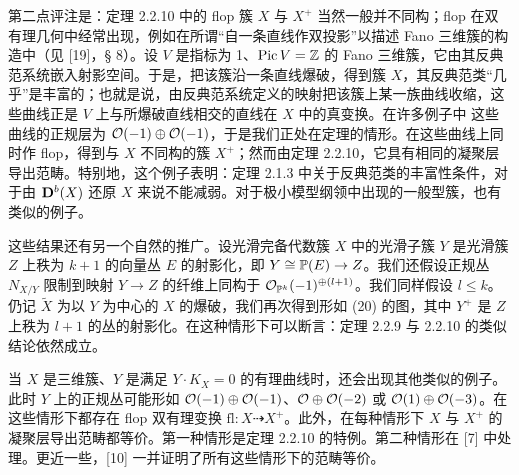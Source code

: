 第二点评注是：定理 2.2.10 中的 flop 簇 $X$ 与 $X^+$ 当然一般并不同构；flop 在双有理几何中经常出现，例如在所谓“自一条直线作双投影”以描述 Fano 三维簇的构造中（见 [19]，§ 8）。设 $V$ 是指标为 1、$\operatorname{Pic} V=\mathbb{Z}$ 的 Fano 三维簇，它由其反典范系统嵌入射影空间。于是，把该簇沿一条直线爆破，得到簇 $X$，其反典范类“几乎”是丰富的；也就是说，由反典范系统定义的映射把该簇上某一族曲线收缩，这些曲线正是 $V$ 上与所爆破直线相交的直线在 $X$ 中的真变换。在许多例子中
这些曲线的正规层为 $\mathcal{O}(-1)\oplus\mathcal{O}(-1)$，于是我们正处在定理的情形。在这些曲线上同时作 flop，得到与 $X$ 不同构的簇 $X^+$；然而由定理 2.2.10，它具有相同的凝聚层导出范畴。特别地，这个例子表明：定理 2.1.3 中关于反典范类的丰富性条件，对于由 $\mathbf{D}^{b}(X)$ 还原 $X$ 来说不能减弱。对于极小模型纲领中出现的一般型簇，也有类似的例子。

这些结果还有另一个自然的推广。设光滑完备代数簇 $X$ 中的光滑子簇 $Y$ 是光滑簇 $Z$ 上秩为 $k+1$ 的向量丛 $E$ 的射影化，即 $Y\cong\mathbb{P}(E)\to Z$。我们还假设正规丛 $N_{X/Y}$ 限制到映射 $Y\to Z$ 的纤维上同构于 $\mathcal{O}_{\mathbb{P}^k}(-1)^{\oplus(l+1)}$。我们同样假设 $l\leqslant k$。仍记 $\tilde X$ 为以 $Y$ 为中心的 $X$ 的爆破，我们再次得到形如 (20) 的图，其中 $Y^+$ 是 $Z$ 上秩为 $l+1$ 的丛的射影化。在这种情形下可以断言：定理 2.2.9 与 2.2.10 的类似结论依然成立。

当 $X$ 是三维簇、$Y$ 是满足 $Y\cdot K_X=0$ 的有理曲线时，还会出现其他类似的例子。此时 $Y$ 上的正规丛可能形如 $\mathcal{O}(-1)\oplus\mathcal{O}(-1)$、$\mathcal{O}\oplus\mathcal{O}(-2)$ 或 $\mathcal{O}(1)\oplus\mathcal{O}(-3)$。在这些情形下都存在 flop 双有理变换 $\mathrm{fl}:X\dashrightarrow X^+$。此外，在每种情形下 $X$ 与 $X^+$ 的凝聚层导出范畴都等价。第一种情形是定理 2.2.10 的特例。第二种情形在 [7] 中处理。更近一些，[10] 一并证明了所有这些情形下的范畴等价。


